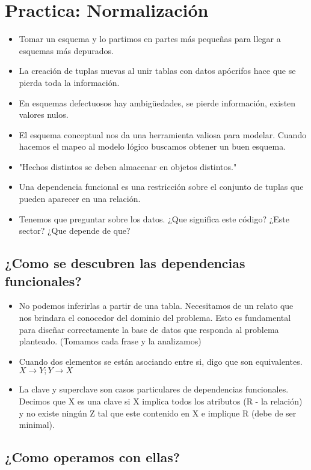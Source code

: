 \section{Practica: Normalización}
\begin{itemize}
\item Tomar un esquema y lo partimos en partes más pequeñas para llegar a esquemas más depurados.
\item La creación de tuplas nuevas al unir tablas con datos apócrifos hace que se pierda toda la información.
\item En esquemas defectuosos hay ambigüedades, se pierde información, existen valores nulos.
\item El esquema conceptual nos da una herramienta valiosa para modelar. Cuando hacemos el mapeo al modelo lógico buscamos obtener un buen esquema.
\item "Hechos distintos se deben almacenar en objetos distintos."
\item Una dependencia funcional es una restricción sobre el conjunto de tuplas que pueden aparecer en una relación. 
\item Tenemos que preguntar sobre los datos. ¿Que significa este código? ¿Este sector? ¿Que depende de que?
\end{itemize}



\subsection*{¿Como se descubren las dependencias funcionales?}
\begin{itemize}
\item No podemos inferirlas a partir de una tabla. Necesitamos de un relato que nos brindara el conocedor del dominio del problema. Esto es fundamental para diseñar correctamente la base de datos que responda al problema planteado. (Tomamos cada frase y la analizamos)
\item Cuando dos elementos se están asociando entre si, digo que son equivalentes. $ X \rightarrow Y ; Y \rightarrow X $
\item La clave y superclave son casos particulares de dependencias funcionales. Decimos que X es una clave si X implica todos los atributos (R - la relación) y no existe ningún Z tal que este contenido en X e implique R (debe de ser minimal).
\end{itemize}


\subsection*{¿Como operamos con ellas?}

